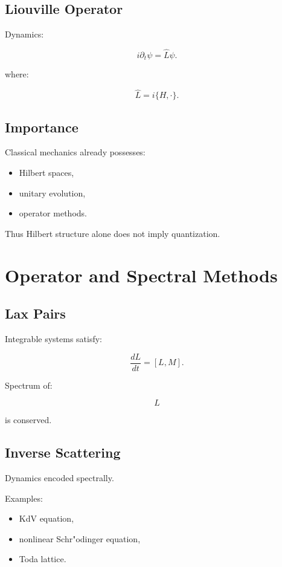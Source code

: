 \documentclass[11pt]{book}
\begin{document}
\section{Liouville Operator}

Dynamics:

\[
i\partial_t\psi
=
\hat L\psi.
\]

where:

\[
\hat L
=
i\{H,\cdot\}.
\]

\section{Importance}

Classical mechanics already possesses:

\begin{itemize}
\item Hilbert spaces,
\item unitary evolution,
\item operator methods.
\end{itemize}

Thus Hilbert structure alone does not imply quantization.

\chapter{Operator and Spectral Methods}

\section{Lax Pairs}

Integrable systems satisfy:

\[
\frac{dL}{dt}=[L,M].
\]

Spectrum of:

\[
L
\]

is conserved.

\section{Inverse Scattering}

Dynamics encoded spectrally.

Examples:

\begin{itemize}
\item KdV equation,
\item nonlinear Schr"odinger equation,
\item Toda lattice.
\end{itemize}
\end{document}
